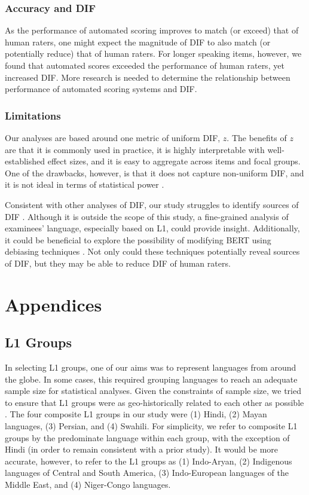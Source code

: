 \documentclass [PhD] {uclathes}
\begin{document}
\subsection{Accuracy and DIF}

As the performance of automated scoring improves to match (or exceed) that of human raters, one might expect the magnitude of DIF to also match (or potentially reduce) that of human raters. For longer speaking items, however, we found that automated scores exceeded the performance of human raters, yet increased DIF. More research is needed to determine the relationship between performance of automated scoring systems and DIF.

\subsection{Limitations}

Our analyses are based around one metric of uniform DIF, $z$. The benefits of $z$ are that it is commonly used in practice, it is highly interpretable with well-established effect sizes, and it is easy to aggregate across items and focal groups. One of the drawbacks, however, is that it does not capture non-uniform DIF, and it is not ideal in terms of statistical power \citep{woods2013}. 

Consistent with other analyses of DIF, our study struggles to identify sources of DIF \citep{zumbo2007}. Although it is outside the scope of this study, a fine-grained analysis of examinees’ language, especially based on L1, could provide insight. Additionally, it could be beneficial to explore the possibility of modifying BERT using debiasing techniques \citep{sun2019mitigating}. Not only could these techniques potentially reveal sources of DIF, but they may be able to reduce DIF of human raters.

\chapter{Appendices}

\section{L1 Groups}
\label{sec:appendix_lang}

In selecting L1 groups, one of our aims was to represent languages from around the globe. In some cases, this required grouping languages to reach an adequate sample size for statistical analyses. Given the constraints of sample size, we tried to ensure that L1 groups were as geo-historically related to each other as possible \citep{brown2005encyclopedia}. The four composite L1 groups in our study were (1) Hindi, (2) Mayan languages, (3) Persian, and (4) Swahili. For simplicity, we refer to composite L1 groups by the predominate language within each group, with the exception of Hindi (in order to remain consistent with a prior study). It would be more accurate, however, to refer to the L1 groups as (1) Indo-Aryan, (2) Indigenous languages of Central and South America, (3) Indo-European languages of the Middle East, and (4) Niger-Congo languages. 
\end{document}
